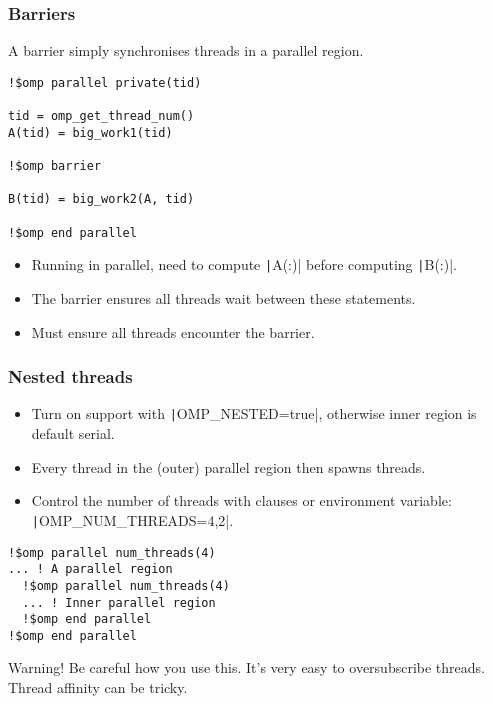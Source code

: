 \documentclass{beamer}
\begin{document}
\begin{frame}[fragile]
\frametitle{Barriers}
A barrier simply synchronises threads in a parallel region.

\begin{verbatim}
!$omp parallel private(tid)

tid = omp_get_thread_num()
A(tid) = big_work1(tid)

!$omp barrier

B(tid) = big_work2(A, tid)

!$omp end parallel
\end{verbatim}

\begin{itemize}
  \item Running in parallel, need to compute \texttt|A(:)| before computing \texttt|B(:)|.
  \item The barrier ensures all threads wait between these statements.
  \item Must ensure all threads encounter the barrier.
\end{itemize}

\end{frame}

\begin{frame}[fragile]
\frametitle{Nested threads}
\begin{itemize}
  \item Turn on support with \texttt|OMP_NESTED=true|, otherwise inner region is default serial.
  \item Every thread in the (outer) parallel region then spawns threads.
  \item Control the number of threads with clauses or environment variable: \texttt|OMP_NUM_THREADS=4,2|.
\end{itemize}

\begin{verbatim}
!$omp parallel num_threads(4)
... ! A parallel region
  !$omp parallel num_threads(4)
  ... ! Inner parallel region
  !$omp end parallel
!$omp end parallel
\end{verbatim}

\begin{alertblock}{Warning!}
Be careful how you use this. It's very easy to oversubscribe threads. Thread affinity can be tricky.
\end{alertblock}
\end{frame}
\end{document}
